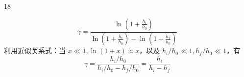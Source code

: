 \begin{solution}{18}
\begin{subsolution}
        \begin{equation}
            \gamma = \frac{\ln \left(1 + \frac{h_i}{h_0}\right)}{\ln \left(1 + \frac{h_i}{h_0}\right) - \ln \left(1 + \frac{h_f}{h_0}\right)}
            \label{eq:16.s18}
        \end{equation}
        利用近似关系式：当 $x \ll 1, \ln(1 + x) \approx x$，以及 $h_i / h_0 \ll 1, h_f / h_0 \ll 1$，有
        \begin{equation}
            \gamma = \frac{h_i / h_0}{h_i / h_0 - h_f / h_0} = \frac{h_i}{h_i - h_f}
            \label{eq:17.s18}
        \end{equation}
    \end{subsolution}
\end{solution}